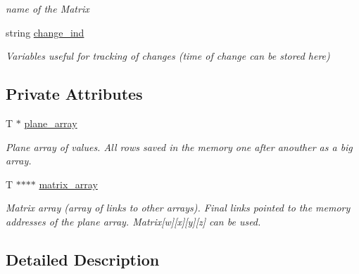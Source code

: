 \begin{DoxyCompactItemize}
\begin{DoxyCompactList}\small\item\em name of the Matrix \end{DoxyCompactList}\item 
\hypertarget{class_matrix4_d_a1cbcd4f5e0fe533be3e696335a0d811d}{}string \hyperlink{class_matrix4_d_a1cbcd4f5e0fe533be3e696335a0d811d}{change\+\_\+ind}\label{class_matrix4_d_a1cbcd4f5e0fe533be3e696335a0d811d}

\begin{DoxyCompactList}\small\item\em Variables useful for tracking of changes (time of change can be stored here) \end{DoxyCompactList}\end{DoxyCompactItemize}
\subsection*{Private Attributes}
\begin{DoxyCompactItemize}
\item 
\hypertarget{class_matrix4_d_ae6752e4daafa3cc170b3d18923802e11}{}T $\ast$ \hyperlink{class_matrix4_d_ae6752e4daafa3cc170b3d18923802e11}{plane\+\_\+array}\label{class_matrix4_d_ae6752e4daafa3cc170b3d18923802e11}

\begin{DoxyCompactList}\small\item\em Plane array of values. All rows saved in the memory one after anouther as a big array. \end{DoxyCompactList}\item 
\hypertarget{class_matrix4_d_a06e285014d93fcc899e71cf3339c054a}{}T $\ast$$\ast$$\ast$$\ast$ \hyperlink{class_matrix4_d_a06e285014d93fcc899e71cf3339c054a}{matrix\+\_\+array}\label{class_matrix4_d_a06e285014d93fcc899e71cf3339c054a}

\begin{DoxyCompactList}\small\item\em Matrix array (array of links to other arrays). Final links pointed to the memory addresses of the plane array. Matrix\mbox{[}w\mbox{]}\mbox{[}x\mbox{]}\mbox{[}y\mbox{]}\mbox{[}z\mbox{]} can be used. \end{DoxyCompactList}\end{DoxyCompactItemize}


\subsection{Detailed Description}
